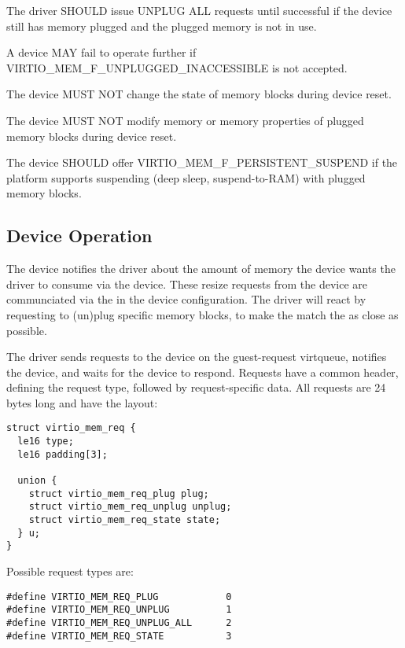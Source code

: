 The driver SHOULD issue UNPLUG ALL requests until successful if the device
still has memory plugged and the plugged memory is not in use.


A device MAY fail to operate further if VIRTIO_MEM_F_UNPLUGGED_INACCESSIBLE
is not accepted.

The device MUST NOT change the state of memory blocks during device reset.

The device MUST NOT modify memory or memory properties of plugged memory
blocks during device reset.

The device SHOULD offer VIRTIO_MEM_F_PERSISTENT_SUSPEND if the platform
supports suspending (deep sleep, suspend-to-RAM) with plugged memory blocks.

\subsection{Device Operation}\label{sec:Device Types / Memory Device / Device Operation}

The device notifies the driver about the amount of memory the device wants
the driver to consume via the device.  These resize requests from the
device are communciated via the  in the device
configuration.  The driver will react by requesting to (un)plug specific
memory blocks, to make the  match the
 as close as possible.

The driver sends requests to the device on the guest-request virtqueue,
notifies the device, and waits for the device to respond.  Requests have a
common header, defining the request type, followed by request-specific
data.  All requests are 24 bytes long and have the layout:

\begin{lstlisting}
struct virtio_mem_req {
  le16 type;
  le16 padding[3];

  union {
    struct virtio_mem_req_plug plug;
    struct virtio_mem_req_unplug unplug;
    struct virtio_mem_req_state state;
  } u;
}
\end{lstlisting}

Possible request types are:

\begin{lstlisting}
#define VIRTIO_MEM_REQ_PLUG            0
#define VIRTIO_MEM_REQ_UNPLUG          1
#define VIRTIO_MEM_REQ_UNPLUG_ALL      2
#define VIRTIO_MEM_REQ_STATE           3
\end{lstlisting}

